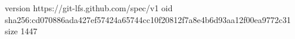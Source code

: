 version https://git-lfs.github.com/spec/v1
oid sha256:cd070886ada427ef57424a65744cc10f20812f7a8e4b6d93aa12f00ea9772c31
size 1447
